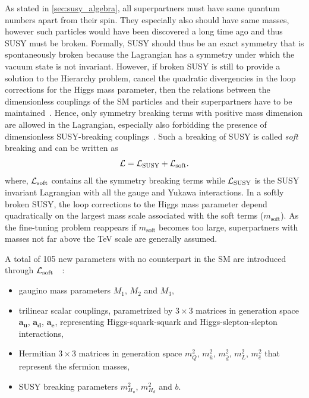 As stated in \cref{sec:susy_algebra}, all superpartners must have same quantum numbers apart from their spin. They especially also should have same masses, however such particles would have been discovered a long time ago and thus SUSY must be broken. Formally, SUSY should thus be an exact symmetry that is spontaneously broken because the Lagrangian has a symmetry under which the vacuum state is not invariant. However, if broken SUSY is still to provide a solution to the Hierarchy problem, \ie cancel the quadratic divergencies in the loop corrections for the Higgs mass parameter, then the relations between the dimensionless couplings of the SM particles and their superpartners have to be maintained~\cite{Martin:1997ns}. Hence, only symmetry breaking terms with positive mass dimension are allowed in the Lagrangian, especially also forbidding the presence of dimensionless SUSY-breaking couplings~\cite{Martin:1997ns}. Such a breaking of SUSY is called \textit{soft} breaking and can be written as
\begin{equation}
	\mathcal{L} = \mathcal{L}_\mathrm{SUSY} + \mathcal{L}_\mathrm{soft}.
\end{equation}
where, $\mathcal{L}_\mathrm{soft}$ contains all the symmetry breaking terms while $\mathcal{L}_\mathrm{SUSY}$ is the SUSY invariant Lagrangian with all the gauge and Yukawa interactions. In a softly broken SUSY, the loop corrections to the Higgs mass parameter depend quadratically on the largest mass scale associated with the soft terms ($m_\mathrm{soft}$). As the fine-tuning problem reappears if $m_\mathrm{soft}$ becomes too large, superpartners with masses not far above the TeV scale are generally assumed.

A total of 105 new parameters with no counterpart in the SM are introduced through $\mathcal{L}_\mathrm{soft}$\ ~\cite{Martin:1997ns,Dimopoulos:1995ju}:
\begin{itemize}
	\item gaugino mass parameters $M_1$, $M_2$ and $M_3$,
	\item trilinear scalar couplings, parametrized by $3\times 3$ matrices in generation space $\boldsymbol{a_u}$, $\boldsymbol{a_d}$, $\boldsymbol{a_e}$, representing Higgs-squark-squark and Higgs-slepton-slepton interactions,
	\item Hermitian $3\times 3$ matrices in generation space \boldmath $m_Q^2$, $m^2_{\bar{u}}$, $m^2_{\bar{d}}$, $m^2_L$, $m^2_{\bar{e}}$ \unboldmath that represent the sfermion masses,
	\item SUSY breaking parameters $m^2_{H_u}$, $m^2_{H_d}$ and $b$.
\end{itemize}

